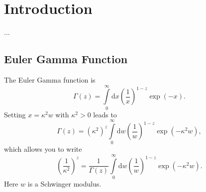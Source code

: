 \chapter{Introduction}
...
\section{Euler Gamma Function}
The Euler Gamma function is
\begin{equation}
	\Gamma(z) = \int\limits_{0}^{\infty} \mathrm{d}x \left( \frac{1}{x} \right)^{1-z} \exp{(-x)}.
\end{equation}
Setting $x = \kappa^{2} w$ with $\kappa^{2} > 0$ leads to
\begin{equation}
	\Gamma(z) = \left( \kappa^{2} \right)^{z} \int\limits_{0}^{\infty} \mathrm{d}w \left( \frac{1}{w} \right)^{1-z} \exp{(- \kappa^{2} w)},
\end{equation}
which allows you to write
\begin{equation}
	\left( \frac{1}{\kappa^{2}} \right)^{z} = \frac{1}{\Gamma(z)} \int\limits_{0}^{\infty} \mathrm{d}w \left( \frac{1}{w} \right)^{1-z} \exp{(- \kappa^{2} w)}.
\end{equation}
Here $w$ is a Schwinger modulus.
